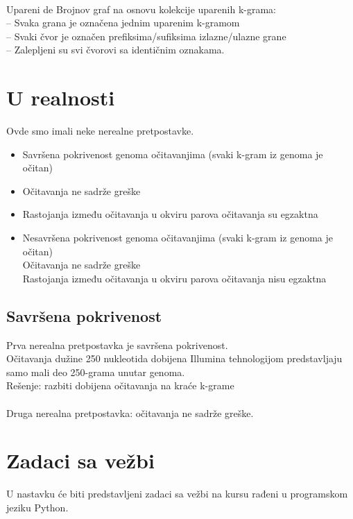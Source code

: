 
~\\ Upareni de Brojnov graf na osnovu kolekcije uparenih k-grama:
\\ – Svaka grana je označena jednim uparenim k-gramom
\\ – Svaki čvor je označen prefiksima/sufiksima izlazne/ulazne grane
\\ – Zalepljeni su svi čvorovi sa identičnim oznakama.

\section{U realnosti}

Ovde smo imali neke nerealne pretpostavke.
\begin{itemize}
	\item  Savršena pokrivenost genoma očitavanjima (svaki k-gram iz genoma je očitan)
	\item Očitavanja ne sadrže greške
	\item Rastojanja između očitavanja u okviru parova očitavanja su egzaktna
	\item Nesavršena pokrivenost genoma očitavanjima (svaki k-gram iz genoma je očitan)
	\\ Očitavanja ne sadrže greške
	\\ Rastojanja između očitavanja u okviru parova očitavanja nisu egzaktna
\end{itemize}

\subsection{Savršena pokrivenost}

Prva nerealna pretpostavka je savršena pokrivenost.
\\
Očitavanja dužine 250 nukleotida dobijena Illumina tehnologijom predstavljaju samo mali deo 250-grama unutar genoma.
\\
Rešenje: razbiti dobijena očitavanja na kraće k-grame
\\
\\
Druga nerealna pretpostavka: očitavanja ne sadrže greške.

\newpage
\section{Zadaci sa vežbi}
U nastavku će biti predstavljeni zadaci sa vežbi na kursu rađeni u programskom jeziku Python.


